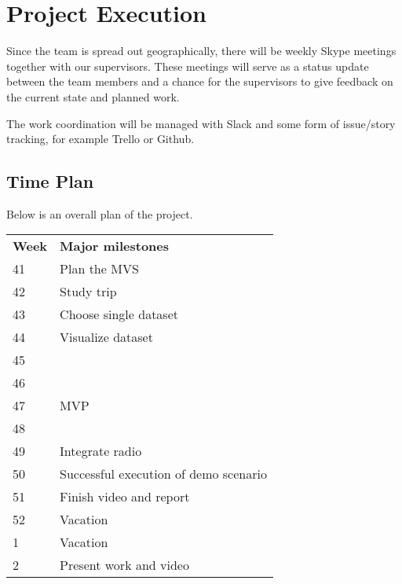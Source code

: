 \section{Project Execution}

Since the team is spread out geographically, there will be weekly Skype meetings together with our supervisors. These meetings will serve as a status update between the team members and a chance for the supervisors to give feedback on the current state and planned work.

The work coordination will be managed with Slack and some form of
issue/story tracking, for example Trello or Github.

\subsection{Time Plan}
Below is an overall plan of the project.
\begin{center}
  \begin{tabular}{ l | l }
    \hline
    \textbf{Week} & \textbf{Major milestones} \\
    41 & Plan the \gls{MVS} \\
    42 & Study trip \\
    43 & Choose single dataset \\
    44 & Visualize dataset \\
    45 & \\
    46 & \\
    47 & MVP \\
    48 & \\
    49 & Integrate radio \\
    50 & Successful execution of demo scenario \\
    51 & Finish video and report \\
    52 & Vacation \\
    1 & Vacation \\
    2 & Present work and video\\
    \hline
  \end{tabular}
\end{center}

